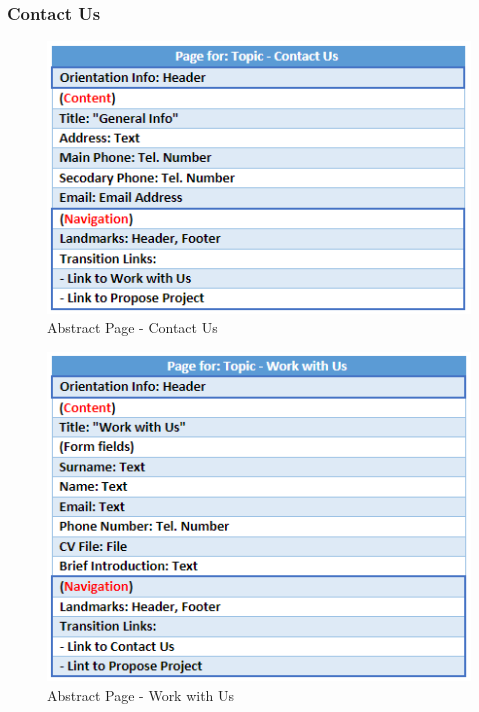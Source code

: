 \documentclass[11pt, letterpaper]{article}
\begin{document}
\subsubsection{Contact Us}
\begin{figure}[H]
    \centering
    \includegraphics[width=15cm]{images/Abstract Pages/AB - Contact Us.png}
    \caption{Abstract Page - Contact Us}
    \label{fig:AbstractPage_Contact_Us}
\end{figure}

\begin{figure}[H]
    \centering
    \includegraphics[width=15cm]{images/Abstract Pages/AB - Work with Us.png}
    \caption{Abstract Page - Work with Us}
    \label{fig:AbstractPage_Work_with_Us}
\end{figure}
\end{document}
